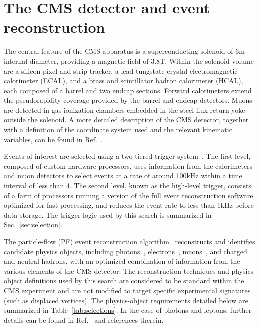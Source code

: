 
\section{The CMS detector and event reconstruction}
\label{sec:reconstruction}

The central feature of the CMS apparatus is a superconducting solenoid
of 6\unit{m} internal diameter, providing a magnetic field of
3.8\unit{T}. Within the solenoid volume are a silicon pixel and strip
tracker, a lead tungstate crystal electromagnetic calorimeter (ECAL),
and a brass and scintillator hadron calorimeter (HCAL), each composed
of a barrel and two endcap sections. Forward calorimeters extend the
pseudorapidity coverage provided by the barrel and endcap
detectors. Muons are detected in gas-ionization chambers embedded in
the steel flux-return yoke outside the solenoid. A more detailed
description of the CMS detector, together with a definition of the
coordinate system used and the relevant kinematic variables, can be
found in Ref.~\cite{Chatrchyan:2008zzk}.

Events of interest are selected using a two-tiered trigger
system~\cite{Khachatryan:2016bia}. The first level, composed of custom
hardware processors, uses information from the calorimeters and muon
detectors to select events at a rate of around 100\unit{kHz} within a
time interval of less than 4\mus. The second level, known as the
high-level trigger, consists of a farm of processors running a version
of the full event reconstruction software optimized for fast
processing, and reduces the event rate to less than 1\unit{kHz} before
data storage. The trigger logic used by this search is summarized in
Sec.~\ref{sec:selection}.

The particle-flow (PF) event reconstruction
algorithm~\cite{CMS-PRF-14-001} reconstructs and identifies candidate
physics objects, including photons~\cite{Khachatryan:2015iwa},
electrons~\cite{Khachatryan:2015hwa}, muons~\cite{Chatrchyan:2012xi},
and charged and neutral hadrons, with an optimized combination of
information from the various elements of the CMS detector. The
reconstruction techniques and physics-object definitions used by this
search are considered to be standard within the CMS experiment and are
not modified to target specific experimental signatures (such as
displaced vertices). The physics-object requirements detailed below
are summarized in Table~\ref{tab:selections}. In the case of photons
and leptons, further details can be found in
Ref.~\cite{Khachatryan:2016dvc} and references therein.

